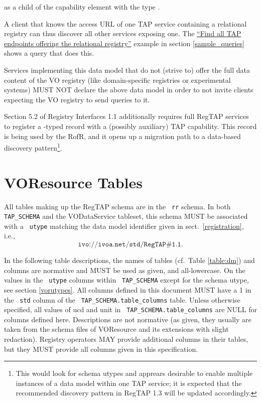 \documentclass[11pt,a4paper]{ivoa}
\newcommand{\tapent}[1]{\texttt{\color{tapcolor} #1}}
\begin{document}
as a child of the capability element with the type
.

A client that knows the access URL of one TAP service containing 
a relational
registry can thus discover all other services exposing one. The \href{#example-findregtap}{``Find all TAP endpoints offering the
relational registry''} example in section
\ref{sample_queries} shows a query that does
this.

Services implementing this data model that do not (strive to) offer
the full data content of the VO registry (like domain-specific
registries or experimental systems) MUST NOT declare the above data
model in order to not invite clients expecting the VO registry to send
queries to it.

Section 5.2 of Registry Interfaces 1.1 additionally requires full RegTAP
services to register a -typed record with a (possibly
auxiliary) TAP capability.  This record is being used by the RofR, and
it opens up a migration path to a data-based discovery
pattern\footnote{This would look for schema utypes and apprears
desirable to enable multiple instances of a data model within one TAP
service; it is expected that the recommended discovery pattern
in RegTAP 1.3 will be updated accordingly.}.




\section{VOResource Tables}

\label{vortables}

All tables making up the RegTAP schema are in the \tapent{rr} schema.
In both \tapent{TAP\_SCHEMA} and the VODataService tableset, this schema
MUST be associated with a \tapent{utype} matching the data model
identifier given in sect.~\ref{registration}, i.e.,
$$\texttt{ivo://ivoa.net/std/RegTAP\#1.1}.$$

In the following table descriptions, the names of tables
(cf.~Table \ref{table:dm}) and columns
are normative and MUST be used as given, and all-lowercase.  On the
values in the \tapent{utype} columns within \tapent{TAP\_SCHEMA} except
for the schema utype,
see section \ref{vorutypes}.  All columns defined in
this document MUST have a 1 in the \tapent{std} column of the
\tapent{TAP\_SCHEMA.table\_columns} table.  Unless otherwise
specified, all values of ucd and unit in
\tapent{TAP\_SCHEMA.table\_columns} are NULL for columns defined here.
Descriptions are not normative (as given, they usually are taken from
the schema files of VOResource and its extensions with slight
redaction).  Registry operators MAY provide additional columns in their
tables, but they MUST provide all columns given in this
specification.
\end{document}
